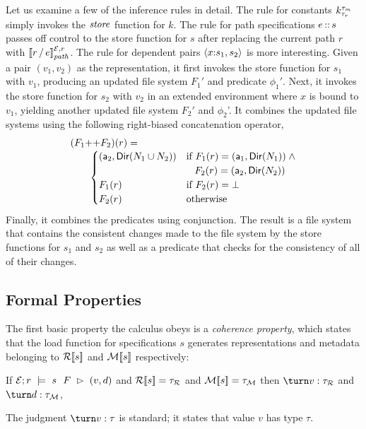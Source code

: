Let us examine a few of the inference rules in detail. The rule for
constants $\Sk$ simply invokes the $\storekname{}$ function for
$k$. The rule for path specifications $\SPath{e}{s}$ passes off
control to the store function for $s$ after replacing the current path
$r$ with $\eval{\PCons{r}{e}}{\Env,r}{\mathit{path}}$. The rule for
dependent pairs $\SPair{x}{s_1}{s_2}$ is more interesting. Given a
pair $(v_1,v_2)$ as the representation, it first invokes the store
function for $s_1$ with $v_1$, producing an updated file system $F_1'$
and predicate $\phi_1'$. Next, it invokes the store function for $s_2$
with $v_2$ in an extended environment where $x$ is bound to $v_1$,
yielding another updated file system $F_2'$ and $\phi_2$'. It combines
the updated file systems using the following right-biased
concatenation operator,
%
\[
\begin{array}{l}
(F_1 \FAppend F_2)(r) = \\
\qquad 
\begin{cases}
  (\att_2,\Dir{N_1 \cup N_2}) & \text{if}~F_1(r) = (\att_1,\Dir{N_1}) \; \wedge \\
                              & \;\;\; F_2(r) = (\att_2,\Dir{N_2})\\
  F_1(r) & \text{if}~F_2(r) = \bot\\
  F_2(r) & \text{otherwise}\\
\end{cases}
\end{array}
\]
%
Finally, it combines the predicates using conjunction. The result is a
file system that contains the consistent changes made to the file
system by the store functions for $s_1$ and $s_2$ as well as a
predicate that checks for the consistency of all of their changes. 

\subsection{Formal Properties}

The first basic property the \forest{} calculus obeys is a {\em coherence
property}, which states that the load function for
specifications $s$ generates representations and metadata belonging to
$\repty{s}$ and $\mdty{s}$ respectively:
%
\begin{proposition}
  If $\load{\Env}{F}{r}{s}{v,d}$ and $\repty{s} = \tau_{\mathcal{R}}$
  and $\mdty{s} = \tau_{\mathcal{M}}$ then $\turn v :
  \tau_{\mathcal{R}}$ and $\turn d : \tau_{\mathcal{M}}$,
\end{proposition}
%
The judgment $\turn v : \tau$ is standard; it states that value $v$ has type $\tau$.

